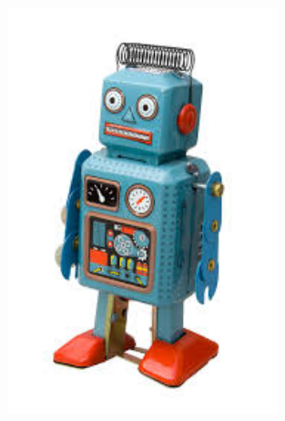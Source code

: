 \documentclass{jfm}
\begin{document}
\begin{figure}
    \centering
    \includegraphics[width=0.7\textwidth]{./figures/robot}
    \caption{}
    \label{fig:KH_drag_reduction}
\end{figure}






\end{document}
